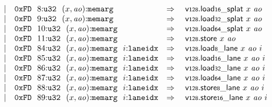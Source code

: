 $$\begin{array}[t]{@{}lrrl@{}l@{}l@{}l@{}}
& & | & \mathtt{0xFD}~~8{:}{\mathtt{u32}}~~(x, {\mathit{ao}}){:}{\mathtt{memarg}} & \quad\Rightarrow\quad{} & {\mathsf{v{\scriptstyle 128}}{.}\mathsf{load}}{{\mathsf{{\scriptstyle 16}}}{\mathsf{\_}}{\mathsf{splat}}}~x~{\mathit{ao}} \\
& & | & \mathtt{0xFD}~~9{:}{\mathtt{u32}}~~(x, {\mathit{ao}}){:}{\mathtt{memarg}} & \quad\Rightarrow\quad{} & {\mathsf{v{\scriptstyle 128}}{.}\mathsf{load}}{{\mathsf{{\scriptstyle 32}}}{\mathsf{\_}}{\mathsf{splat}}}~x~{\mathit{ao}} \\
& & | & \mathtt{0xFD}~~10{:}{\mathtt{u32}}~~(x, {\mathit{ao}}){:}{\mathtt{memarg}} & \quad\Rightarrow\quad{} & {\mathsf{v{\scriptstyle 128}}{.}\mathsf{load}}{{\mathsf{{\scriptstyle 64}}}{\mathsf{\_}}{\mathsf{splat}}}~x~{\mathit{ao}} \\
& & | & \mathtt{0xFD}~~11{:}{\mathtt{u32}}~~(x, {\mathit{ao}}){:}{\mathtt{memarg}} & \quad\Rightarrow\quad{} & \mathsf{v{\scriptstyle 128}}{.}\mathsf{store}~x~{\mathit{ao}} \\
& & | & \mathtt{0xFD}~~84{:}{\mathtt{u32}}~~(x, {\mathit{ao}}){:}{\mathtt{memarg}}~~i{:}{\mathtt{laneidx}} & \quad\Rightarrow\quad{} & {\mathsf{v{\scriptstyle 128}}{.}\mathsf{load}}{\mathsf{{\scriptstyle 8}}}{\mathsf{\_}}{\mathsf{lane}}~x~{\mathit{ao}}~i \\
& & | & \mathtt{0xFD}~~85{:}{\mathtt{u32}}~~(x, {\mathit{ao}}){:}{\mathtt{memarg}}~~i{:}{\mathtt{laneidx}} & \quad\Rightarrow\quad{} & {\mathsf{v{\scriptstyle 128}}{.}\mathsf{load}}{\mathsf{{\scriptstyle 16}}}{\mathsf{\_}}{\mathsf{lane}}~x~{\mathit{ao}}~i \\
& & | & \mathtt{0xFD}~~86{:}{\mathtt{u32}}~~(x, {\mathit{ao}}){:}{\mathtt{memarg}}~~i{:}{\mathtt{laneidx}} & \quad\Rightarrow\quad{} & {\mathsf{v{\scriptstyle 128}}{.}\mathsf{load}}{\mathsf{{\scriptstyle 32}}}{\mathsf{\_}}{\mathsf{lane}}~x~{\mathit{ao}}~i \\
& & | & \mathtt{0xFD}~~87{:}{\mathtt{u32}}~~(x, {\mathit{ao}}){:}{\mathtt{memarg}}~~i{:}{\mathtt{laneidx}} & \quad\Rightarrow\quad{} & {\mathsf{v{\scriptstyle 128}}{.}\mathsf{load}}{\mathsf{{\scriptstyle 64}}}{\mathsf{\_}}{\mathsf{lane}}~x~{\mathit{ao}}~i \\
& & | & \mathtt{0xFD}~~88{:}{\mathtt{u32}}~~(x, {\mathit{ao}}){:}{\mathtt{memarg}}~~i{:}{\mathtt{laneidx}} & \quad\Rightarrow\quad{} & {\mathsf{v{\scriptstyle 128}}{.}\mathsf{store}}{\mathsf{{\scriptstyle 8}}}{\mathsf{\_}}{\mathsf{lane}}~x~{\mathit{ao}}~i \\
& & | & \mathtt{0xFD}~~89{:}{\mathtt{u32}}~~(x, {\mathit{ao}}){:}{\mathtt{memarg}}~~i{:}{\mathtt{laneidx}} & \quad\Rightarrow\quad{} & {\mathsf{v{\scriptstyle 128}}{.}\mathsf{store}}{\mathsf{{\scriptstyle 16}}}{\mathsf{\_}}{\mathsf{lane}}~x~{\mathit{ao}}~i \\

\end{array}$$
